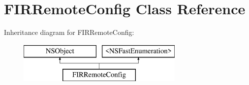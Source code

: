 \hypertarget{interface_f_i_r_remote_config}{}\section{F\+I\+R\+Remote\+Config Class Reference}
\label{interface_f_i_r_remote_config}
Inheritance diagram for F\+I\+R\+Remote\+Config\+:\begin{figure}[H]
\begin{center}
\leavevmode
\includegraphics[height=2.000000cm]{interface_f_i_r_remote_config}
\end{center}
\end{figure}
